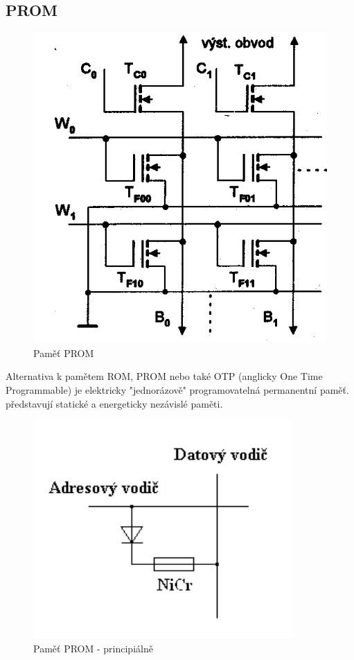  
\subsection{PROM}
     \begin{figure}[h]
   \begin{center}
     \includegraphics[scale=0.4]{images/PROM2.png}
   \end{center}
   \caption{Paměť PROM}
  \end{figure}
Alternativa k pamětem ROM, PROM nebo také OTP (anglicky One Time
Programmable) je elektricky "jednorázově" programovatelná permanentní paměť. představují statické a energeticky nezávislé paměti.
    \begin{figure}[h]
   \begin{center}
     \includegraphics[scale=0.4]{images/PROM.png}
   \end{center}
   \caption{Paměť PROM - principiálně}
  \end{figure}
